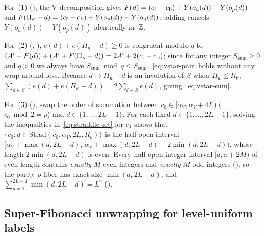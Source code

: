 \begin{outline}
For~(1) (), the V decomposition gives $F(d) = (c_{\mathrm{f}} - c_{\mathrm{b}}) + Y(o_u(d)) -
Y(o_p(d))$ and $F(\Pi_\kappa - d) = (c_{\mathrm{f}} - c_{\mathrm{b}}) + Y(o_p(d)) - Y(o_u(d))$; adding cancels $Y(o_u(d)) - Y(o_p(d))$
identically in~$\mathbb{Z}$.

For~(2) (, ), $e(d) + e(\Pi_\kappa - d) \ge 0$ is congruent modulo $q$ to
$(A' + F(d)) + (A' + F(\Pi_\kappa - d)) = 2A' + 2(c_{\mathrm{f}} - c_{\mathrm{b}})$; since for any integer $S_{\mathrm{sum}} \ge 0$ and
$q > 0$ we always have $S_{\mathrm{sum}} \bmod q \le S_{\mathrm{sum}}$,~\eqref{eq:vstar-pair} holds without any wrap-around
loss. Because $d \mapsto \Pi_\kappa - d$ is an involution of $S$ when $\Pi_\kappa \le R_k$, $\sum_{d \in S} (e(d) +
e(\Pi_\kappa - d)) = 2 \sum_{d \in S} e(d)$, giving~\eqref{eq:vstar-sum}.

For~(3) (), swap the order of summation between $c_0 \in [\alpha_V, \alpha_V + 4L)$
($c_0 \bmod 2 = p$) and $d \in \{1, \dots, 2L - 1\}$. For each fixed $d \in \{1, \dots, 2L - 1\}$, solving the inequalities
in~\eqref{eq:straddle-set} for $c_0$ shows that $\{c_0 : d \in \mathrm{Strad}(c_0, \alpha_V, 2L, R_k)\}$ is the half-open
interval $[\alpha_V + \max(d, 2L - d),\, \alpha_V + \max(d, 2L - d) + 2 \min(d, 2L - d))$, whose length $2 \min(d, 2L - d)$
is even. Every half-open integer interval $[a, a + 2M)$ of even length contains \emph{exactly} $M$ even integers and
\emph{exactly} $M$ odd integers (), so the parity-$p$ fiber has exact size $\min(d, 2L - d)$,
and $\sum_{d=1}^{2L-1} \min(d, 2L - d) = L^2$ ().
\end{outline}

\subsection{Super-Fibonacci unwrapping for level-uniform labels}\label{sec:dnp-fib}

